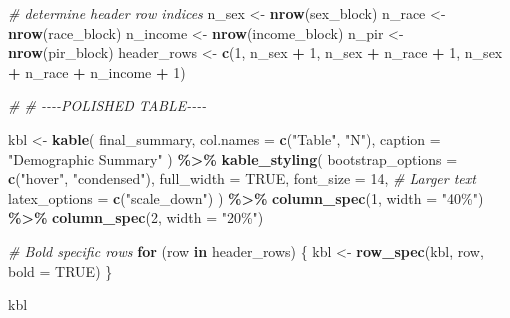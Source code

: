 \documentclass[
]{article}
\newenvironment{Shaded}{\begin{snugshade}}{\end{snugshade}}
\newcommand{\AttributeTok}[1]{\textcolor[rgb]{0.13,0.29,0.53}{#1}}
\newcommand{\CommentTok}[1]{\textcolor[rgb]{0.56,0.35,0.01}{\textit{#1}}}
\newcommand{\ConstantTok}[1]{\textcolor[rgb]{0.56,0.35,0.01}{#1}}
\newcommand{\ControlFlowTok}[1]{\textcolor[rgb]{0.13,0.29,0.53}{\textbf{#1}}}
\newcommand{\DecValTok}[1]{\textcolor[rgb]{0.00,0.00,0.81}{#1}}
\newcommand{\FunctionTok}[1]{\textcolor[rgb]{0.13,0.29,0.53}{\textbf{#1}}}
\newcommand{\NormalTok}[1]{#1}
\newcommand{\OtherTok}[1]{\textcolor[rgb]{0.56,0.35,0.01}{#1}}
\newcommand{\SpecialCharTok}[1]{\textcolor[rgb]{0.81,0.36,0.00}{\textbf{#1}}}
\newcommand{\StringTok}[1]{\textcolor[rgb]{0.31,0.60,0.02}{#1}}
\begin{document}
\begin{Shaded}
\begin{Highlighting}[]
\CommentTok{\# determine header row indices}
\NormalTok{n\_sex }\OtherTok{\textless{}{-}} \FunctionTok{nrow}\NormalTok{(sex\_block)}
\NormalTok{n\_race }\OtherTok{\textless{}{-}} \FunctionTok{nrow}\NormalTok{(race\_block)}
\NormalTok{n\_income }\OtherTok{\textless{}{-}} \FunctionTok{nrow}\NormalTok{(income\_block)}
\NormalTok{n\_pir }\OtherTok{\textless{}{-}} \FunctionTok{nrow}\NormalTok{(pir\_block)}
\NormalTok{header\_rows }\OtherTok{\textless{}{-}} \FunctionTok{c}\NormalTok{(}\DecValTok{1}\NormalTok{, n\_sex }\SpecialCharTok{+} \DecValTok{1}\NormalTok{, n\_sex }\SpecialCharTok{+}\NormalTok{ n\_race }\SpecialCharTok{+} \DecValTok{1}\NormalTok{, n\_sex }\SpecialCharTok{+}\NormalTok{ n\_race }\SpecialCharTok{+}\NormalTok{ n\_income }\SpecialCharTok{+} \DecValTok{1}\NormalTok{)}

\CommentTok{\# \# {-}{-}{-}{-}POLISHED TABLE{-}{-}{-}{-}}

\NormalTok{kbl }\OtherTok{\textless{}{-}} \FunctionTok{kable}\NormalTok{(}
\NormalTok{  final\_summary,}
  \AttributeTok{col.names =} \FunctionTok{c}\NormalTok{(}\StringTok{"Table"}\NormalTok{, }\StringTok{"N"}\NormalTok{),}
  \AttributeTok{caption =} \StringTok{"Demographic Summary"}
\NormalTok{) }\SpecialCharTok{\%\textgreater{}\%}
  \FunctionTok{kable\_styling}\NormalTok{(}
    \AttributeTok{bootstrap\_options =} \FunctionTok{c}\NormalTok{(}\StringTok{"hover"}\NormalTok{, }\StringTok{"condensed"}\NormalTok{),}
    \AttributeTok{full\_width =} \ConstantTok{TRUE}\NormalTok{,}
    \AttributeTok{font\_size =} \DecValTok{14}\NormalTok{,  }\CommentTok{\# Larger text}
    \AttributeTok{latex\_options =} \FunctionTok{c}\NormalTok{(}\StringTok{"scale\_down"}\NormalTok{)}
\NormalTok{  ) }\SpecialCharTok{\%\textgreater{}\%}
  \FunctionTok{column\_spec}\NormalTok{(}\DecValTok{1}\NormalTok{, }\AttributeTok{width =} \StringTok{"40\%"}\NormalTok{) }\SpecialCharTok{\%\textgreater{}\%}
  \FunctionTok{column\_spec}\NormalTok{(}\DecValTok{2}\NormalTok{, }\AttributeTok{width =} \StringTok{"20\%"}\NormalTok{)}

\CommentTok{\# Bold specific rows}
\ControlFlowTok{for}\NormalTok{ (row }\ControlFlowTok{in}\NormalTok{ header\_rows) \{}
\NormalTok{  kbl }\OtherTok{\textless{}{-}} \FunctionTok{row\_spec}\NormalTok{(kbl, row, }\AttributeTok{bold =} \ConstantTok{TRUE}\NormalTok{)}
\NormalTok{\}}

\NormalTok{kbl}
\end{Highlighting}
\end{Shaded}

\begingroup\fontsize{14}{16}\selectfont
\end{document}
